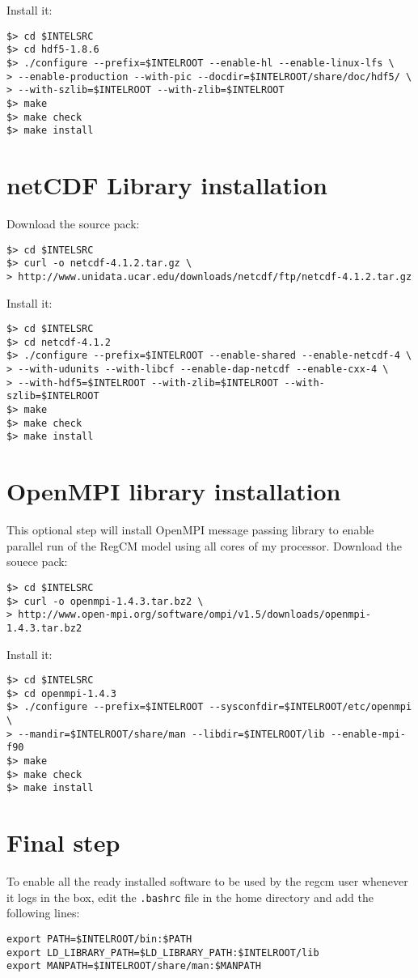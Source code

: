 Install it:

\begin{Verbatim}
$> cd $INTELSRC
$> cd hdf5-1.8.6
$> ./configure --prefix=$INTELROOT --enable-hl --enable-linux-lfs \
> --enable-production --with-pic --docdir=$INTELROOT/share/doc/hdf5/ \
> --with-szlib=$INTELROOT --with-zlib=$INTELROOT
$> make
$> make check
$> make install
\end{Verbatim}

\section{netCDF Library installation}

Download the source pack:

\begin{Verbatim}
$> cd $INTELSRC
$> curl -o netcdf-4.1.2.tar.gz \
> http://www.unidata.ucar.edu/downloads/netcdf/ftp/netcdf-4.1.2.tar.gz
\end{Verbatim}

Install it:

\begin{Verbatim}
$> cd $INTELSRC
$> cd netcdf-4.1.2
$> ./configure --prefix=$INTELROOT --enable-shared --enable-netcdf-4 \
> --with-udunits --with-libcf --enable-dap-netcdf --enable-cxx-4 \
> --with-hdf5=$INTELROOT --with-zlib=$INTELROOT --with-szlib=$INTELROOT
$> make
$> make check
$> make install
\end{Verbatim}

\section{OpenMPI library installation}

This optional step will install OpenMPI message passing library to enable
parallel run of the RegCM model using all cores of my processor.
Download the souece pack:

\begin{Verbatim}
$> cd $INTELSRC
$> curl -o openmpi-1.4.3.tar.bz2 \
> http://www.open-mpi.org/software/ompi/v1.5/downloads/openmpi-1.4.3.tar.bz2
\end{Verbatim}

Install it:

\begin{Verbatim}
$> cd $INTELSRC
$> cd openmpi-1.4.3
$> ./configure --prefix=$INTELROOT --sysconfdir=$INTELROOT/etc/openmpi \
> --mandir=$INTELROOT/share/man --libdir=$INTELROOT/lib --enable-mpi-f90 
$> make
$> make check
$> make install
\end{Verbatim}

\section{Final step}

To enable all the ready installed software to be used by the regcm user whenever
it logs in the box, edit the \verb=.bashrc= file in the home directory and add
the following lines:

\begin{Verbatim}
export PATH=$INTELROOT/bin:$PATH
export LD_LIBRARY_PATH=$LD_LIBRARY_PATH:$INTELROOT/lib
export MANPATH=$INTELROOT/share/man:$MANPATH
\end{Verbatim}
